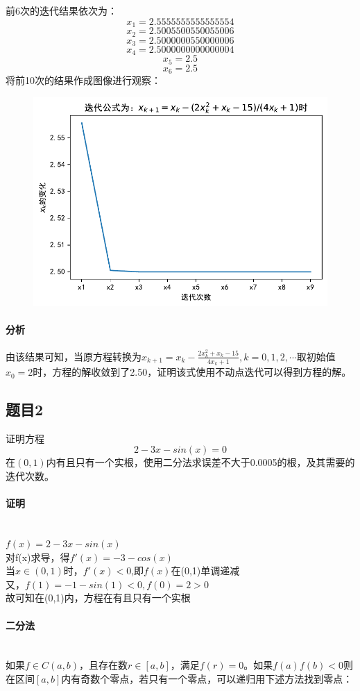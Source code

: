 前6次的迭代结果依次为：\[ x_{1}=2.5555555555555554 \]
\[ x_{2}=2.5005500550055006 \]
\[ x_{3}=2.5000000550000006 \]
\[ x_{4}=2.5000000000000004 \]
\[ x_{5}=2.5 \]
\[ x_{6}=2.5 \]
将前10次的结果作成图像进行观察：
\begin{figure}[H]
	\centering
	\includegraphics[width=0.7\linewidth]{2-1-3.pdf}
	\caption{}
	\label{fig:2-1-2}
\end{figure}

\paragraph{分析}

由该结果可知，当原方程转换为$x_{k+1}=x_k-\frac{2x_k^2+x_k-15}{4x_k+1},k=0,1,2,\cdots$取初始值$x_0=2$时，方程的解收敛到了2.50，证明该式使用不动点迭代可以得到方程的解。

\subsection{题目2}

证明方程\[2-3x-sin(x)=0\]在$(0,1)$内有且只有一个实根，使用二分法求误差不大于0.0005的根，及其需要的迭代次数。


\paragraph{证明}
~\\
$f(x)=2-3x-sin(x)$\\对f(x)求导，得$f'(x)=-3-cos(x)$\\当$x \in (0,1)$时，$f'(x)<0$,即$f(x)$在(0,1)单调递减\\又，$f(1)=-1-sin(1)<0,f(0)=2>0$\\故可知在(0,1)内，方程在有且只有一个实根


\paragraph{二分法}
~\\
如果$f\in C(a,b)$，且存在数$r\in[a,b]$，满足$f(r)=0$。如果$f(a)f(b)<0$则在区间$[a,b]$内有奇数个零点，若只有一个零点，可以递归用下述方法找到零点：

